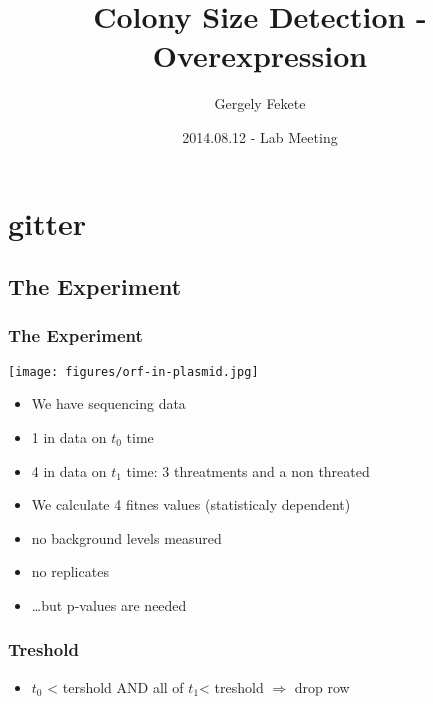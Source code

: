\documentclass{beamer}
\title{Colony Size Detection  -  Overexpression}
\author{Gergely Fekete}
\date{2014.08.12 -  Lab Meeting}
\begin{document}
\begin{frame}
\titlepage
\end{frame}

\section{gitter}
\subsection{The Experiment}



\begin{frame}
\frametitle<presentation>{The Experiment}
\texttt{[image: figures/orf-in-plasmid.jpg]}
\begin{itemize}
   \item  We have sequencing data
   \item 1 in data on $t_0$ time
   \item 4 in data on $t_1$ time: 3 threatments and a non threated
   \item We calculate 4 fitnes values (statisticaly dependent)
   
   
   \item no background levels measured
   \item no replicates
   
   \item \ldots but p-values are needed
   
 \end{itemize}
\end{frame}



\begin{frame}
\frametitle<presentation>{Treshold}
\begin{itemize}
  
  
  
   \item $t_0$ < tershold  AND all of $t_1$< treshold $\Rightarrow$ drop row
 \end{itemize}
\end{frame}
\end{document}
